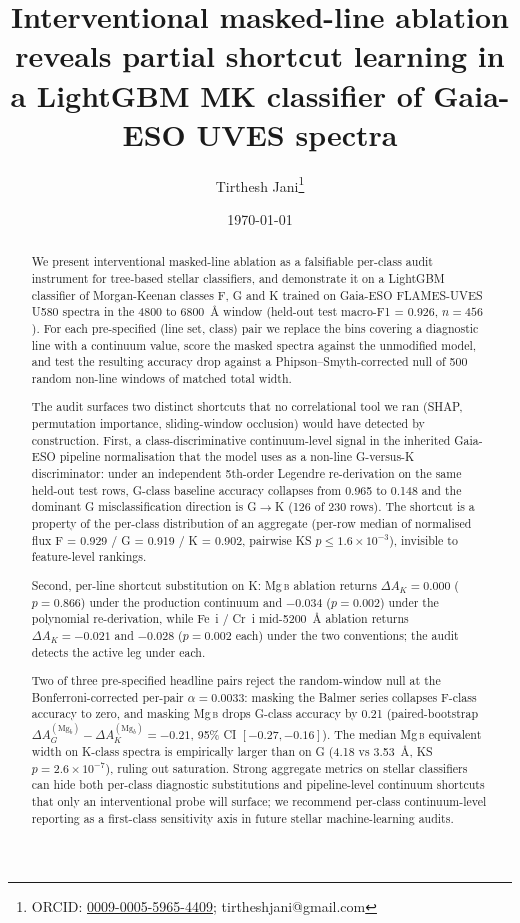 \documentclass[11pt,a4paper]{article}
\title{Interventional masked-line ablation reveals partial shortcut learning in a LightGBM MK classifier of Gaia-ESO UVES spectra}
\author[1]{Tirthesh Jani\thanks{ORCID: \href{https://orcid.org/0009-0005-5965-4409}{0009-0005-5965-4409}; tirtheshjani@gmail.com}}
\affil[1]{Independent researcher, Barrie, Ontario, Canada}
\date{\today}
\newcommand{\Mgb}{Mg\,\textsc{b}\xspace}
\newcommand{\dA}{\Delta A}
\begin{document}
\maketitle

\begin{abstract}
\noindent We present interventional masked-line ablation as a falsifiable per-class audit instrument for tree-based stellar classifiers, and demonstrate it on a LightGBM classifier of Morgan-Keenan classes F, G and K trained on Gaia-ESO FLAMES-UVES U580 spectra in the 4800 to 6800~\AA{} window (held-out test macro-F1 = 0.926, $n = 456$). For each pre-specified (line set, class) pair we replace the bins covering a diagnostic line with a continuum value, score the masked spectra against the unmodified model, and test the resulting accuracy drop against a Phipson--Smyth-corrected null of 500 random non-line windows of matched total width.

\noindent The audit surfaces two distinct shortcuts that no correlational tool we ran (SHAP, permutation importance, sliding-window occlusion) would have detected by construction. First, a class-discriminative continuum-level signal in the inherited Gaia-ESO pipeline normalisation that the model uses as a non-line G-versus-K discriminator: under an independent 5th-order Legendre re-derivation on the same held-out test rows, G-class baseline accuracy collapses from 0.965 to 0.148 and the dominant G misclassification direction is G$\to$K (126 of 230 rows). The shortcut is a property of the per-class distribution of an aggregate (per-row median of normalised flux F = 0.929 / G = 0.919 / K = 0.902, pairwise KS $p \leq 1.6 \times 10^{-3}$), invisible to feature-level rankings.

\noindent Second, per-line shortcut substitution on K: \Mgb ablation returns $\dA_K = 0.000$ ($p = 0.866$) under the production continuum and $-0.034$ ($p = 0.002$) under the polynomial re-derivation, while Fe~i / Cr~i mid-5200~\AA{} ablation returns $\dA_K = -0.021$ and $-0.028$ ($p = 0.002$ each) under the two conventions; the audit detects the active leg under each.

\noindent Two of three pre-specified headline pairs reject the random-window null at the Bonferroni-corrected per-pair $\alpha = 0.0033$: masking the Balmer series collapses F-class accuracy to zero, and masking \Mgb drops G-class accuracy by 0.21 (paired-bootstrap $\dA_G^{(\mathrm{Mg}_b)} - \dA_K^{(\mathrm{Mg}_b)} = -0.21$, 95\% CI $[-0.27, -0.16]$). The median \Mgb equivalent width on K-class spectra is empirically larger than on G (4.18 vs 3.53~\AA{}, KS $p = 2.6 \times 10^{-7}$), ruling out saturation. Strong aggregate metrics on stellar classifiers can hide both per-class diagnostic substitutions and pipeline-level continuum shortcuts that only an interventional probe will surface; we recommend per-class continuum-level reporting as a first-class sensitivity axis in future stellar machine-learning audits.
\end{abstract}
\end{document}

